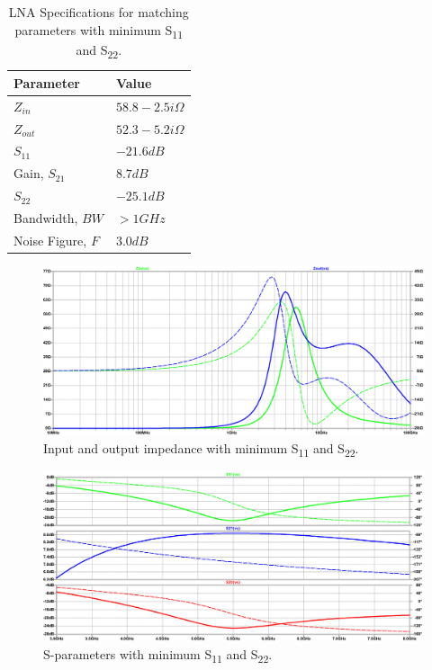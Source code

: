 \documentclass{article}
\begin{document}
\begin{enumerate}[A.]
\begin{enumerate}
\begin{table}[htbp]
\caption{\label{tab:specs-q6d1}LNA Specifications for matching parameters with minimum S\textsubscript{11} and S\textsubscript{22}.}
\centering
\begin{tabular}{ll}
\hline
Parameter & Value\\
\hline
\(Z_{in}\) & \(58.8 - 2.5i \Omega\)\\
\(Z_{out}\) & \(52.3 - 5.2i \Omega\)\\
\(S_{11}\) & \(-21.6 dB\)\\
Gain, \(S_{21}\) & \(8.7 dB\)\\
\(S_{22}\) & \(-25.1 dB\)\\
Bandwidth, \(BW\) & \(> 1 GHz\)\\
Noise Figure, \(F\) & \(3.0 dB\)\\
\hline
\end{tabular}
\end{table}

\begin{figure}[H]
\centering
\includegraphics[width=.9\linewidth]{img/q6/zin-zout-s-matched.pdf}
\caption{\label{fig:zin-zout-s-matched-q6}Input and output impedance with minimum S\textsubscript{11} and S\textsubscript{22}.}
\end{figure}

\begin{figure}[H]
\centering
\includegraphics[width=.9\linewidth]{img/q6/s-s-matched.pdf}
\caption{\label{fig:s-param-s-matched-q6}S-parameters with minimum S\textsubscript{11} and S\textsubscript{22}.}
\end{figure}


\end{enumerate}
\end{enumerate}
\end{document}
